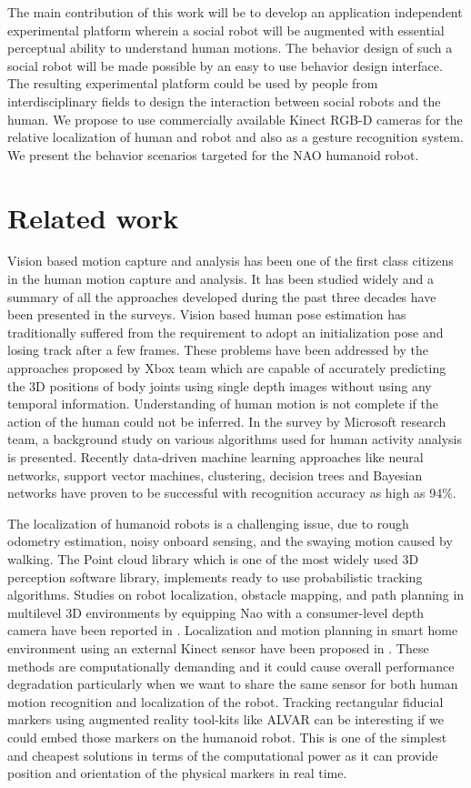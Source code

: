 \documentclass{llncs}
\begin{document}
The main contribution of this work will be to develop an application independent experimental platform wherein a social robot will be augmented with essential perceptual ability to understand human motions. The behavior design of such a social robot will be made possible by an easy to use behavior design interface. The resulting experimental platform could be used by people from interdisciplinary fields to design the interaction between social robots and the human. We propose to use commercially available Kinect\cite{Kinect2014} RGB-D cameras for the relative localization of human and robot and also as a gesture recognition system. We present the behavior scenarios targeted for the NAO\cite{NaoTheRobot} humanoid robot.
\section{Related work}
	Vision based motion capture and analysis has been one of the first class citizens in the human motion capture and analysis. It has been studied widely and a summary of all the approaches developed during the past three decades have been presented in the surveys\cite{Moeslund200690}\cite{Poppe20074}. Vision based human pose estimation has traditionally suffered from the requirement to adopt an initialization pose and losing track after a few frames. These problems have been addressed by the approaches proposed by Xbox\cite{Kinect2014} team which are capable of accurately predicting the 3D positions of body joints using single depth images without using any temporal information\cite{Shotton2013}. Understanding of human motion is not complete if the action of the human could not be inferred. In the survey by Microsoft research team\cite{KinectCV2013}, a background study on various algorithms used for human activity analysis is presented. Recently data-driven machine learning approaches like neural networks, support vector machines, clustering, decision trees and Bayesian networks have proven to be successful with recognition accuracy as high as 94\%\cite{Kinect2014}.
	
	The localization of humanoid robots is a challenging issue, due to rough odometry estimation, noisy onboard sensing, and the swaying motion caused by walking\cite{Cervera2012}. The Point cloud library\cite{RusuPCL11} which is one of the most widely used 3D perception software library, implements ready to use probabilistic tracking algorithms. Studies on robot localization, obstacle mapping, and path planning in multilevel 3D environments by equipping Nao with a consumer-level depth camera have been reported in \cite{Maier2012}. Localization and motion planning in smart home environment using an external Kinect sensor have been proposed in \cite{Cervera2012}. These methods are computationally demanding and it could cause overall performance degradation particularly when we want to share the same sensor for both human motion recognition and localization of the robot. Tracking rectangular fiducial markers using  augmented reality tool-kits like ALVAR\cite{ALVAR} can be interesting if we could embed those markers on the humanoid robot. This is one of the simplest and cheapest solutions in terms of the computational power as it can provide position and orientation of the physical markers in real time.
	
\end{document}
